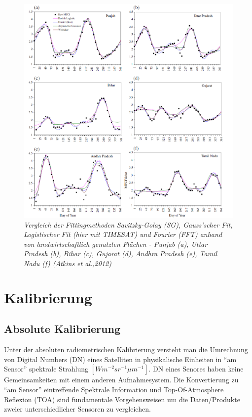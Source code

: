 \documentclass[11pt]{report}
\begin{document}
\begin{figure}[H]
\centering
\includegraphics[scale=0.6]{./Grafiken/Fitting/Atkinson_et_al_Vergleich_FFT_SG_LOG_GAU_6locations_agriculture.PNG}
\caption{\textit{Vergleich der Fittingmethoden Savitzky-Golay (SG), Gauss'scher Fit, Logistischer Fit (hier mit TIMESAT) und Fourier (FFT) anhand von landwirtschaftlich genutzten Flächen - Punjab (a), Uttar Pradesh (b), Bihar (c), Gujarat (d), Andhra Pradesh (e), Tamil Nadu (f) (Atkins et al.,2012)}}
\end{figure}







% 
\section{Kalibrierung}

\subsection{Absolute Kalibrierung}
Unter der absoluten radiometrischen Kalibrierung versteht man die Umrechnung von Digital Numbers (DN) eines Satelliten in physikalische Einheiten in "`am Sensor"' spektrale Strahlung $\left[Wm^{-2}sr^{-1}\mu m^{-1}\right]$. DN eines Senores haben keine Gemeinsamkeiten mit einem anderen Aufnahmesystem. Die Konvertierung zu "`am Sensor"' eintreffende Spektrale Information und Top-Of-Atmosphere Reflexion (TOA) sind fundamentale Vorgehensweisen um die Daten/Produkte zweier unterschiedlicher Sensoren zu vergleichen. 
\end{document}
